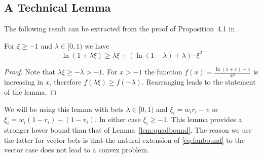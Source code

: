 \subsection{A Technical Lemma}
\label{app:fan}
The following result can be extracted from the proof of 
Proposition~4.1 in \cite{fan2015exponential}.
\begin{lemma}
For $\xi\geq -1$ and $\lambda \in [0,1)$ we have
\begin{equation}
\ln(1+\lambda \xi) \geq \lambda \xi+\left(\ln\left(1-\lambda\right)+\lambda\right)\cdot \xi^{2}
\label{eq:fanbound}
\end{equation}
\end{lemma}
\begin{proof}
Note that $\lambda \xi \geq -\lambda > -1$. 
For $x>-1$ the function $f(x) = \frac{\ln(1 + x)-x}{x^2}$
is increasing in $x$, therefore
$f(\lambda \xi) \geq f(-\lambda)$. Rearranging
leads to the statement of the lemma.
\end{proof}
We will be using this lemma with bets 
$\lambda \in [0,1)$ and $\xi_i=w_ir_i-v$ or $\xi_i=w_i(1-r_i)-(1-v_i)$.
In either case $\xi_i\geq -1$.
This lemma provides a stronger lower bound than 
that of Lemma~\ref{lem:quadbound}. The reason
we use the latter for vector bets is that the
natural extension of \eqref{eq:fanbound} to 
the vector case does not lead to a convex 
problem. 

